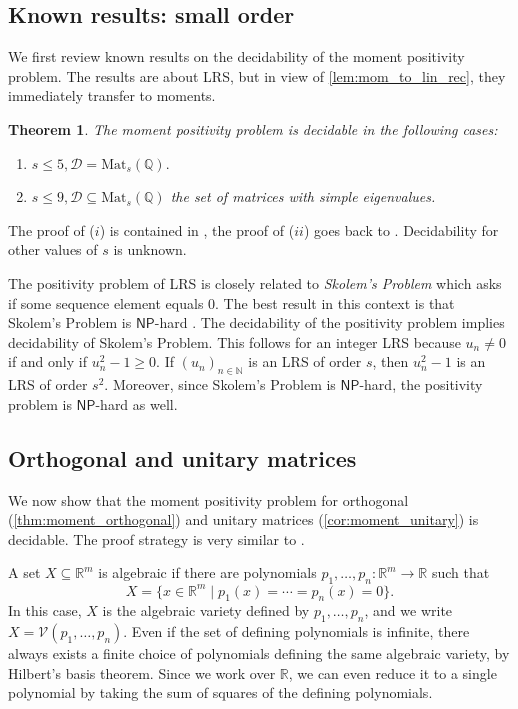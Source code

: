 \documentclass[11pt]{article}
\newtheorem{theorem}{Theorem}
\theoremstyle{definition}
\newcommand{\NP}{\mathsf{NP}}
\begin{document}
\subsection{Known results: small order}
\label{ssec:known}

We first review known results on the decidability of the moment positivity problem. The results are about LRS, but in view of \cref{lem:mom_to_lin_rec}, they immediately transfer to moments. 

\begin{theorem}
\label{thm:moment_decidable_1}
The moment positivity problem is decidable in the following cases:
\begin{enumerate}[label=$(\roman*)$]
	\item $s\leqslant 5, \mathcal D=\mathrm{Mat}_s(\mathbb Q).$  
	\item $s\leqslant 9, \mathcal D\subseteq\mathrm{Mat}_s(\mathbb Q)$ the set of matrices with simple eigenvalues.
	\end{enumerate}
\end{theorem}
The proof of ($i$) is contained in \cite{OW}, the proof of ($ii$) goes back to \cite{OW2}. 
Decidability for other values of $s$ is unknown.

The positivity problem of LRS is closely related to \emph{Skolem's Problem} which asks if some sequence element equals $0$. The best result in this context is that Skolem's Problem is $\NP$-hard \cite{Bl01}. The decidability of the positivity problem implies decidability of Skolem's Problem. This follows for an integer LRS because $u_n \neq 0$  if and only if $u_n^2 - 1 \geqslant 0$. If $(u_n)_{n \in \mathbb{N}}$ is an LRS of order $s$, then $u_n^2 - 1$ is an LRS of order $s^2$. Moreover, since Skolem's Problem is $\NP$-hard, the positivity problem is $\NP$-hard as well.

\subsection{Orthogonal and unitary matrices}
\label{ssec:unitary}

We now show that the moment positivity problem for orthogonal (\cref{thm:moment_orthogonal}) and unitary matrices (\cref{cor:moment_unitary}) is decidable. The proof strategy is very similar to \cite{Bl03}.

A set $X \subseteq \mathbb{R}^m$ is algebraic if there are polynomials $p_1, \ldots, p_n\colon \mathbb{R}^m\to \mathbb{R}$ such that
$$X = \{x \in \mathbb{R}^m\mid p_1(x) = \cdots = p_n(x) = 0\}.$$
In this case, $X$ is the algebraic variety defined by $p_1, \ldots, p_n$, and we write $X = \mathcal{V}(p_1, \ldots, p_n)$. Even if the set of defining polynomials is infinite, there always exists a finite choice of polynomials defining the same algebraic variety, by Hilbert's basis theorem. Since we work over $\mathbb R$, we can even reduce it to a single polynomial by taking the sum of squares of the defining polynomials. 
\end{document}

